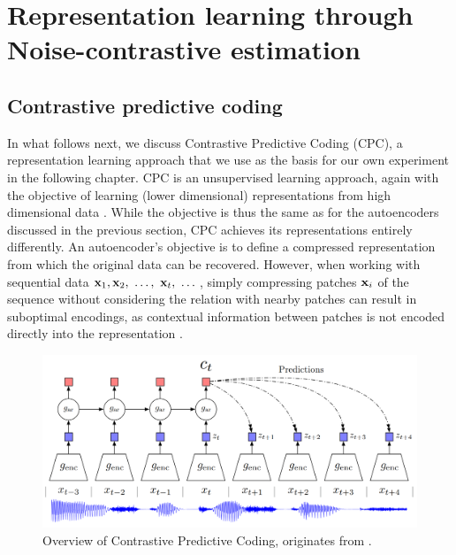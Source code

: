 	
	
	
	
	
	
	
	
	
	



\section{Representation learning through Noise-contrastive estimation} \label{cha:bg_nce}

\subsection{Contrastive predictive coding}

	In what follows next, we discuss Contrastive Predictive Coding (CPC), a representation learning approach that we use as the basis for our own experiment in the following chapter.
	CPC is an unsupervised learning approach, again with the objective of learning (lower dimensional) representations from high dimensional data \citep{oordRepresentationLearningContrastive2019}. While the objective is thus the same as for the autoencoders discussed in the previous section, CPC achieves its representations entirely differently. An autoencoder's objective is to define a compressed representation from which the original data can be recovered. However, when working with sequential data $\mathbf{x}_1,\mathbf{x}_2,~\dots, ~\mathbf{x}_t,~\dots$, simply compressing patches $\mathbf{x}_i$ of the sequence without considering the relation with nearby patches can result in suboptimal encodings, as contextual information between patches is not encoded directly into the representation \citep{shah92LearningGood2020}.


\begin{figure}[h] %
	\centering
	\includegraphics[width=0.7\linewidth]{"cpc overview"}
	\caption{Overview of Contrastive Predictive Coding, originates from \citep{oordRepresentationLearningContrastive2019}.}
	\label{fig:cpc-overview}
\end{figure}

